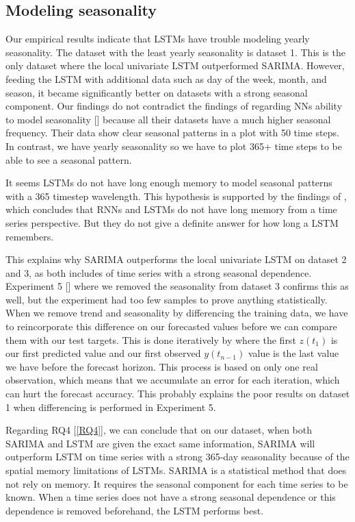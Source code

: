 
\subsection{Modeling seasonality}
Our empirical results indicate that LSTMs have trouble modeling yearly seasonality.
The dataset with the least yearly seasonality is dataset 1. This is the only dataset where
the local univariate LSTM outperformed SARIMA. However, feeding the LSTM with additional
data such as day of the week, month, and season, it became significantly better on datasets
with a strong seasonal component.
Our findings do not contradict the findings of \cite{Hewamalage2021} regarding NNs ability
to model seasonality []
because all their datasets have a much higher seasonal frequency. Their
data show clear seasonal patterns in a plot with 50 time steps. In contrast, we have yearly seasonality
so we have to plot 365+ time steps to be able to see a seasonal pattern.

It seems LSTMs do not have long enough memory to model seasonal patterns
with a 365 timestep wavelength.
This hypothesis is supported by the findings of \cite{Zhao2020}, which concludes that
RNNs and LSTMs do not have long memory from a time series perspective.
But they do not give a definite answer for how long a LSTM remembers.

This explains why SARIMA outperforms the local univariate LSTM on dataset 2 and 3, as both includes
of time series with a strong seasonal dependence.
Experiment 5 [] where we removed
the seasonality from dataset 3 confirms this as well, but the experiment had too few samples
to prove anything statistically. When we remove trend and seasonality by differencing the training data,
we have to reincorporate this difference on our forecasted values before we can compare them with our
test targets. This is done iteratively by  where the first
$z(t_1)$ is our first predicted value and our first observed $y(t_{n-1})$ value is the last value
we have before the forecast horizon. This process is based on only one real observation, which means
that we accumulate an error for each iteration, which can hurt the forecast accuracy.
This probably explains the poor results on dataset 1 when differencing is performed in Experiment 5.

Regarding RQ4 [\ref{RQ4}], we can conclude that on our dataset, when
both SARIMA and LSTM are given the exact same information, SARIMA will outperform
LSTM on time series with a strong 365-day seasonality because of the spatial memory limitations
of LSTMs.
SARIMA is a statistical method that does not rely on memory.
It requires the seasonal component for each time series to be known.
When a time series does not have a strong seasonal dependence or this
dependence is removed beforehand, the LSTM performs best.

